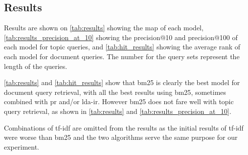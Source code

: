 \subsection{Results}\label{subsec:results}

Results are shown on \autoref{tab:results} showing the \acrlong{map} of each model, \autoref{tab:results_precision_at_10} showing the precision@10 and precision@100 of each model for topic queries, and \autoref{tab:hit_results} showing the average rank of each model for document queries.
The number for the query sets represent the length of the queries.

\autoref{tab:results} and \autoref{tab:hit_results} show that \gls{bm25} is clearly the best model for document query retrieval, with all the best results using \gls{bm25}, sometimes combined with \gls{pr} and/or \gls{lda}-\gls{ir}. 
However \gls{bm25} does not fare well with topic query retrieval, as shown in \autoref{tab:results} and \autoref{tab:results_precision_at_10}.

Combinations of \gls{tf-idf} are omitted from the results as the initial results of \gls{tf-idf} were worse than \gls{bm25} and the two algorithms serve the same purpose for our experiment.


